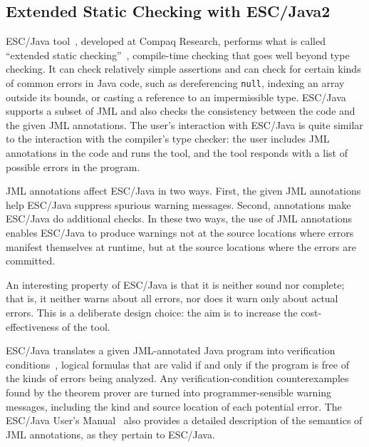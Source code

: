 

\subsection{Extended Static Checking with ESC/Java2}
\label{escjava}

ESC/Java tool~\cite{Flanagan-Et-Al02}, developed at Compaq Research,
performs what is called ``extended static
checking''~\cite{ESC:Overview,10yearsESC},
compile-time checking that goes well beyond type checking.  It can
check relatively simple assertions and can check for certain kinds of
common errors in Java code, such as dereferencing \texttt{null},
indexing an array outside its bounds, or casting a reference to an
impermissible type.  ESC/Java supports a subset of JML and also checks
the consistency between the code and the given JML annotations.  The
user's interaction with ESC/Java is quite similar to the interaction
with the compiler's type checker: the user includes JML annotations in
the code and runs the tool, and the tool responds with a list of
possible errors in the program.

JML annotations affect ESC/Java in two ways.  First, the given JML
annotations help ESC/Java suppress spurious warning messages.   Second,
annotations make ESC/\-Java do additional checks.  
In these two ways, the use of JML annotations enables ESC/Java to
produce warnings not at the source locations where errors manifest
themselves at runtime, but at the source locations where the errors
are committed.

An interesting property of ESC/Java is that it is neither sound nor
complete; that is, it neither warns about all errors, nor does it
warn only about actual errors.  This is a deliberate design choice:
the aim is to increase the cost-effectiveness of the tool.  

ESC/Java translates a
given JML-an\-no\-tat\-ed Java program into verification
conditions~\cite{LeinoSaxeStata:JavaViaGC,FlanaganSaxe:POPL01},
logical formulas that are valid if and only if the program is free of
the kinds of errors being analyzed.  Any verification-condition
counterexamples found by the theorem prover are turned into
programmer-sensible warning messages, including the kind and source
location of each potential error.  The ESC/Java User's
Manual~\cite{escjava:userman} also provides a detailed description of
the semantics of JML annotations, as they pertain to ESC/Java.

